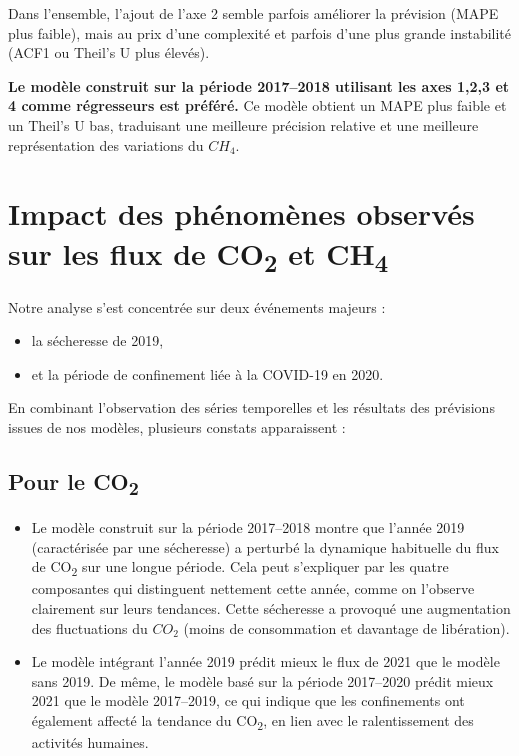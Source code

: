 \documentclass[a4paper,12pt]{report}%
\begin{document}
Dans l'ensemble, l'ajout de l'axe 2 semble parfois améliorer la prévision (MAPE plus faible), mais au prix d'une complexité et parfois d'une plus grande instabilité (ACF1 ou Theil's U plus élevés).  \par
\textbf{Le modèle construit sur la période 2017–2018 utilisant les axes 1,2,3 et 4 comme régresseurs est préféré.}
Ce modèle obtient un MAPE plus faible et un Theil’s U  bas, traduisant une meilleure précision relative et une meilleure représentation des variations du $CH_4$. 





\section{Impact des phénomènes observés sur les flux de CO\textsubscript{2} et CH\textsubscript{4}}
\vspace{2em}

Notre analyse s’est concentrée sur deux événements majeurs : 
\begin{itemize}
    \item la sécheresse de 2019,
    \item et la période de confinement liée à la COVID-19 en 2020.
\end{itemize}

En combinant l’observation des séries temporelles et les résultats des prévisions issues de nos modèles, plusieurs constats apparaissent :

\subsection*{Pour le CO\textsubscript{2}}
\begin{itemize}
    \item Le modèle construit sur la période 2017–2018 montre que l’année 2019 (caractérisée par une sécheresse) a perturbé la dynamique habituelle du flux de CO\textsubscript{2} sur une longue période. Cela peut s’expliquer par les quatre composantes qui distinguent nettement cette année, comme on l’observe clairement sur leurs tendances. Cette sécheresse a provoqué une augmentation des fluctuations du $CO_2$ (moins de consommation et davantage de libération).

 
    \item Le modèle intégrant l’année 2019 prédit mieux le flux de 2021 que le modèle sans 2019. De même, le modèle basé sur la période 2017–2020 prédit mieux 2021 que le modèle 2017–2019, ce qui indique que les confinements ont également affecté la tendance du CO\textsubscript{2}, en lien avec le ralentissement des activités humaines.

\end{itemize}
\end{document}
